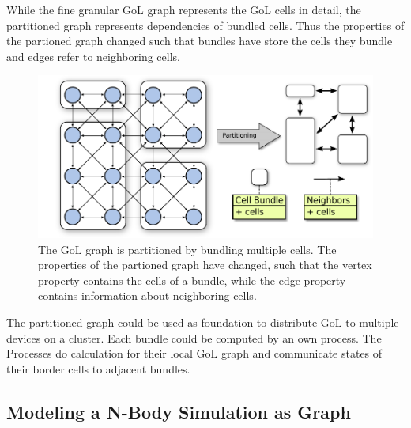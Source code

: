 While the fine granular GoL graph represents the GoL cells in detail, the
partitioned graph represents dependencies of bundled cells. Thus
the properties of the partioned graph changed such that bundles
have store the cells they bundle and edges refer to neighboring
cells.

\begin{figure}[H]
  \centering \includegraphics[width=\textwidth]{graphics/30_gol_bundle}
  \caption{The GoL graph is partitioned by bundling multiple
    cells. The properties of the partioned graph have changed, such
    that the vertex property contains the cells of a bundle, while the
    edge property contains information about neighboring cells.}
  \label{fig:gol_bundle}
\end{figure}

The partitioned graph could be used as foundation to distribute GoL to
multiple devices on a cluster. Each bundle could be computed by an own
process. The Processes do calculation for their local GoL graph and
communicate states of their border cells to adjacent bundles.


\subsection{Modeling a N-Body Simulation as Graph}


